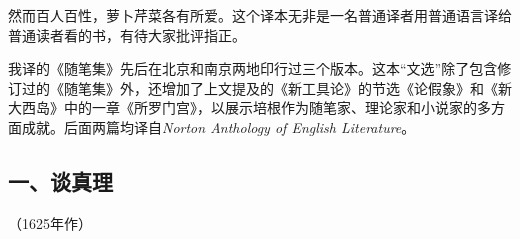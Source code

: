 \par 然而百人百性，萝卜芹菜各有所爱。这个译本无非是一名普通译者用普通语言译给普通读者看的书，有待大家批评指正。
\par 我译的《随笔集》先后在北京和南京两地印行过三个版本。这本“文选”除了包含修订过的《随笔集》外，还增加了上文提及的《新工具论》的节选《论假象》和《新大西岛》中的一章《所罗门宫》，以展示培根作为随笔家、理论家和小说家的多方面成就。后面两篇均译自\textsl{Norton Anthology of English Literature}。
\par {}
\par {}



\subsection*{一、谈真理}

\begin{center}
    （1625年作）
\end{center}

